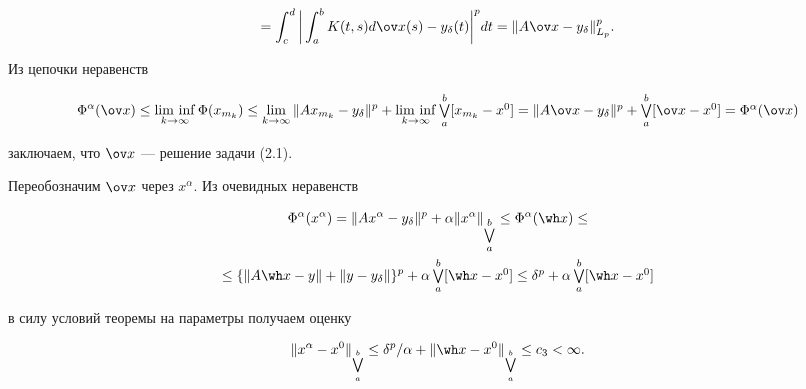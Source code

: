 \begin{pf}
\begin{multline*}
%


=\int_c^d\bigg|\int_a^bK(t,s)


d\ov x(s)- y_\delta(t)\bigg|^p dt=\|A\ov x-y_\delta\|_{L_p}^p.


\end{multline*}


Из цепочки неравенств


$$


\Phi^\alpha(\ov x) \le \Liminf_{k\to\infty}\Phi(x_{m_k})


\le \lim_{k\to\infty}\|Ax_{m_k}-y_\delta\|^p


+\Liminf_{k\to\infty}\textstyle\bigvee\limits_a^b[x_{m_k} - x^0]=


\|A\ov x-y_{\delta}\|^p + \textstyle\bigvee\limits_a^b[\ov x - x^0] =


\Phi^\alpha(\ov x)


$$


заключаем, что $\ov x$ --- решение задачи (2.1).





Переобозначим $\ov x$ через $x^\alpha$. Из очевидных неравенств


\begin{multline*}


\Phi^\alpha(x^\alpha) = \|Ax^\alpha-y_\delta\|^p


+ \alpha \|x^\alpha\|_{\textstyle\bigvee\limits_a^b} \le


\Phi^\alpha(\wh x) \le \\


%


\le \{\|A\wh x-y\| + \|y - y_\delta\|\}^p +


\alpha\textstyle\bigvee\limits_a^b[\wh x - x^0]\le


\delta^p + \alpha\textstyle\bigvee\limits_a^b[\wh x - x^0]


\end{multline*}


в силу условий теоремы на параметры получаем оценку


\begin{equation}


\|x^\alpha - x^0\|_{\bigvee\limits_a^b} \le \delta^p/\alpha +


\|\wh x - x^0\|_{\bigvee\limits_a^b} \le c_3 < \infty.


\end{equation}






\end{pf}
